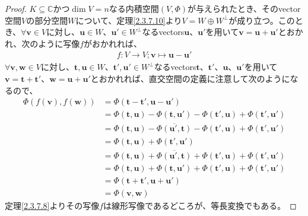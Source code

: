 \documentclass[dvipdfmx]{jsarticle}
\begin{document}
\begin{proof}
$K \subseteq \mathbb{C}$かつ$\dim V = n$なる内積空間$(V,\varPhi)$が与えられたとき、そのvector空間$V$の部分空間$W$について、定理\ref{2.3.7.10}より$V = W \oplus W^{\bot}$が成り立つ。このとき、$\forall\mathbf{v} \in V$に対し、$\mathbf{u} \in W$、$\mathbf{u}' \in W^{\bot}$なるvectors$\mathbf{u}$、$\mathbf{u}'$を用いて$\mathbf{v} = \mathbf{u} + \mathbf{u}'$とおかれ、次のように写像$f$がおかれれば、
\begin{align*}
f:V \rightarrow V;\mathbf{v} \mapsto \mathbf{u} - \mathbf{u}'
\end{align*}
$\forall\mathbf{v},\mathbf{w} \in V$に対し、$\mathbf{t},\mathbf{u} \in W$、$\mathbf{t}',\mathbf{u}' \in W^{\bot}$なるvectors$\mathbf{t}$、$\mathbf{t}'$、$\mathbf{u}$、$\mathbf{u}'$を用いて$\mathbf{v} = \mathbf{t} + \mathbf{t}'$、$\mathbf{w} = \mathbf{u} + \mathbf{u}'$とおかれれば、直交空間の定義に注意して次のようになるので、
\begin{align*}
\varPhi\left( f\left( \mathbf{v} \right),f\left( \mathbf{w} \right) \right) &= \varPhi\left( \mathbf{t} - \mathbf{t}',\mathbf{u} - \mathbf{u}' \right)\\
&= \varPhi\left( \mathbf{t},\mathbf{u} \right) - \varPhi\left( \mathbf{t},\mathbf{u}' \right) - \varPhi\left( \mathbf{t}',\mathbf{u} \right) + \varPhi\left( \mathbf{t}',\mathbf{u}' \right)\\
&= \varPhi\left( \mathbf{t},\mathbf{u} \right) - \overline{\varPhi\left( \mathbf{u}',\mathbf{t} \right)} - \varPhi\left( \mathbf{t}',\mathbf{u} \right) + \varPhi\left( \mathbf{t}',\mathbf{u}' \right)\\
&= \varPhi\left( \mathbf{t},\mathbf{u} \right) + \varPhi\left( \mathbf{t}',\mathbf{u}' \right)\\
&= \varPhi\left( \mathbf{t},\mathbf{u} \right) + \overline{\varPhi\left( \mathbf{u}',\mathbf{t} \right)} + \varPhi\left( \mathbf{t}',\mathbf{u} \right) + \varPhi\left( \mathbf{t}',\mathbf{u}' \right)\\
&= \varPhi\left( \mathbf{t},\mathbf{u} \right) + \varPhi\left( \mathbf{t},\mathbf{u}' \right) + \varPhi\left( \mathbf{t}',\mathbf{u} \right) + \varPhi\left( \mathbf{t}',\mathbf{u}' \right)\\
&= \varPhi\left( \mathbf{t} + \mathbf{t}',\mathbf{u} + \mathbf{u}' \right)\\
&= \varPhi\left( \mathbf{v},\mathbf{w} \right)
\end{align*}
定理\ref{2.3.7.8}よりその写像$f$は線形写像であるどころが、等長変換でもある。\par

\end{proof}
\end{document}
